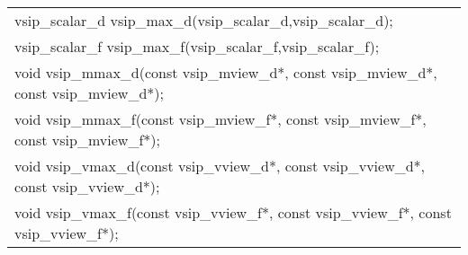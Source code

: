 \\\cvsiplh
\afh
{
\ttfamily
\\\hspace*{.04\textwidth}\begin{tabular}[H]{l}
vsip\_scalar\_d vsip\_max\_d(vsip\_scalar\_d,vsip\_scalar\_d);\\
vsip\_scalar\_f vsip\_max\_f(vsip\_scalar\_f,vsip\_scalar\_f);\\
void vsip\_mmax\_d(const vsip\_mview\_d*, const vsip\_mview\_d*, const vsip\_mview\_d*);\\
void vsip\_mmax\_f(const vsip\_mview\_f*, const vsip\_mview\_f*, const vsip\_mview\_f*);\\
void vsip\_vmax\_d(const vsip\_vview\_d*, const vsip\_vview\_d*, const vsip\_vview\_d*);\\
void vsip\_vmax\_f(const vsip\_vview\_f*, const vsip\_vview\_f*, const vsip\_vview\_f*);\\
\end{tabular}
}
\\\pyjvsiph
%
%
%
